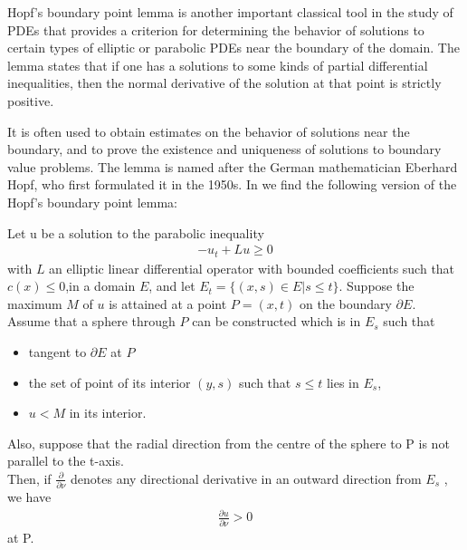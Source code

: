Hopf's boundary point lemma is another important classical tool in the study of PDEs that provides a criterion for determining the behavior of solutions to certain types of elliptic or parabolic PDEs near the boundary of the domain. The lemma states that if one has a solutions to some kinds of partial differential inequalities, then the normal derivative of the solution at that point is strictly positive.

It is often used to obtain estimates on the behavior of solutions near the boundary, and to prove the existence and uniqueness of solutions to boundary value problems. The lemma is named after the German mathematician Eberhard Hopf, who first formulated it in the 1950s. In \cite{protterweinberger} we find the following version of the Hopf's boundary point lemma:

\begin{theorem}
	Let u be a solution to the parabolic inequality 
	\begin{align*}
		-u_t+Lu\geq 0
	\end{align*} 
	with $L$ an elliptic linear differential operator with bounded coefficients such that $c(x)\leq 0$,in a domain $E$, and let $E_t = \{(x, s) \in E | s \leq t\}$. Suppose the maximum $M$ of $u$ is attained at a point $P=(x, t)$ on the boundary $\partial E$. \\
	Assume that a sphere through $P$ can be constructed which is in $E_s$ such that
	\begin{itemize}\itemsep0em 
		\item tangent to $\partial E$ at $P$
		\item the set of point of its interior $(y, s)$ such that $s\leq t$ lies in $E_s$, 
		\item  $u < M$ in its interior.
	\end{itemize}	
	Also, suppose that the radial direction from the centre of the sphere to P is not parallel to the t-axis. \\
	Then, if $\frac{\partial}{\partial \nu}$ denotes any directional derivative in an outward direction from $E_s$ , we have
	\begin{align*}
		\frac{\partial u}{\partial \nu} > 0
	\end{align*}
	at P.\label{HopfBPL}
\end{theorem}


